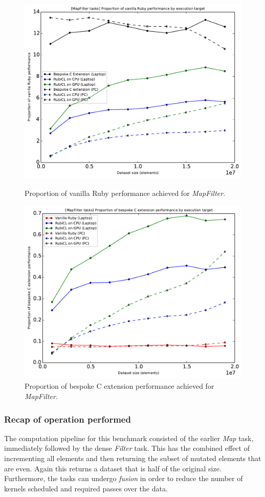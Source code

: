 \begin{figure}[H]
  \centering
  \includegraphics[width=\textwidth]{./graphing/mapfilter/prop_van.pdf}
  \caption{Proportion of vanilla Ruby performance achieved for \emph{MapFilter}.}
  \label{fig:mfilter_task_vperf_g}

  \includegraphics[width=\textwidth]{./graphing/mapfilter/prop_bes.pdf}
  \caption{Proportion of bespoke C extension performance achieved for \emph{MapFilter}.}
  \label{fig:mfilter_task_bperf_g}
\end{figure}
\subsubsection{Recap of operation performed}
The computation pipeline for this benchmark consisted of the earlier \emph{Map} task, immediately followed by the dense \emph{Filter} task.
This has the combined effect of incrementing all elements and then returning the subset of mutated elements that are even.
Again this returns a dataset that is half of the original size. Furthermore, the tasks can undergo \emph{fusion} in order to reduce the number of kernels scheduled and required passes over the data.


